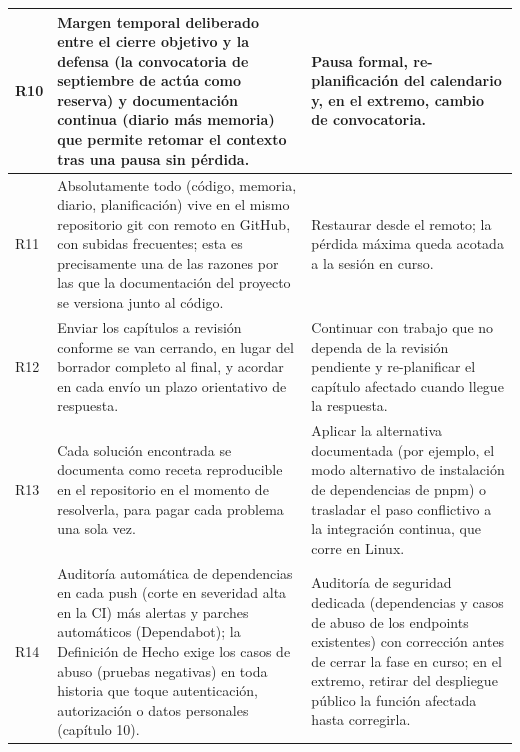 \documentclass[11pt,a4paper]{article}
\begin{document}
{\begin{longtable}{|>{\RaggedRight\arraybackslash}p{0.8cm}|>{\RaggedRight\arraybackslash}p{6.9cm}|>{\RaggedRight\arraybackslash}p{6.9cm}|}
R10 & Margen temporal deliberado entre el cierre objetivo y la defensa (la convocatoria de septiembre de \thesisYear{} actúa como reserva) y documentación continua (diario más memoria) que permite retomar el contexto tras una pausa sin pérdida. & Pausa formal, re-planificación del calendario y, en el extremo, cambio de convocatoria. \\ \hline

R11 & Absolutamente todo (código, memoria, diario, planificación) vive en el mismo repositorio git con remoto en GitHub, con subidas frecuentes; esta es precisamente una de las razones por las que la documentación del proyecto se versiona junto al código. & Restaurar desde el remoto; la pérdida máxima queda acotada a la sesión en curso. \\ \hline

R12 & Enviar los capítulos a revisión conforme se van cerrando, en lugar del borrador completo al final, y acordar en cada envío un plazo orientativo de respuesta. & Continuar con trabajo que no dependa de la revisión pendiente y re-planificar el capítulo afectado cuando llegue la respuesta. \\ \hline

R13 & Cada solución encontrada se documenta como receta reproducible en el repositorio en el momento de resolverla, para pagar cada problema una sola vez. & Aplicar la alternativa documentada (por ejemplo, el modo alternativo de instalación de dependencias de pnpm) o trasladar el paso conflictivo a la integración continua, que corre en Linux. \\ \hline

R14 & Auditoría automática de dependencias en cada push (corte en severidad alta en la CI) más alertas y parches automáticos (Dependabot); la Definición de Hecho exige los casos de abuso (pruebas negativas) en toda historia que toque autenticación, autorización o datos personales (capítulo 10). & Auditoría de seguridad dedicada (dependencias y casos de abuso de los endpoints existentes) con corrección antes de cerrar la fase en curso; en el extremo, retirar del despliegue público la función afectada hasta corregirla. \\ \hline

\end{longtable}
}
\end{document}
